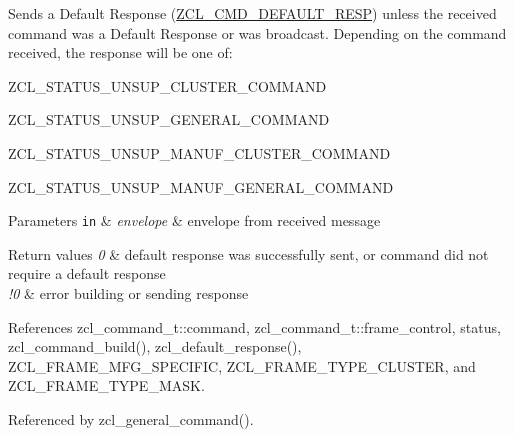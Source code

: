 Sends a Default Response (\hyperlink{group__zcl_ga92499f538455b8d5a525510fba54adb2}{Z\-C\-L\-\_\-\-C\-M\-D\-\_\-\-D\-E\-F\-A\-U\-L\-T\-\_\-\-R\-E\-S\-P}) unless the received command was a Default Response or was broadcast. Depending on the command received, the response will be one of\-:
\begin{DoxyItemize}
\item Z\-C\-L\-\_\-\-S\-T\-A\-T\-U\-S\-\_\-\-U\-N\-S\-U\-P\-\_\-\-C\-L\-U\-S\-T\-E\-R\-\_\-\-C\-O\-M\-M\-A\-N\-D
\item Z\-C\-L\-\_\-\-S\-T\-A\-T\-U\-S\-\_\-\-U\-N\-S\-U\-P\-\_\-\-G\-E\-N\-E\-R\-A\-L\-\_\-\-C\-O\-M\-M\-A\-N\-D
\item Z\-C\-L\-\_\-\-S\-T\-A\-T\-U\-S\-\_\-\-U\-N\-S\-U\-P\-\_\-\-M\-A\-N\-U\-F\-\_\-\-C\-L\-U\-S\-T\-E\-R\-\_\-\-C\-O\-M\-M\-A\-N\-D
\item Z\-C\-L\-\_\-\-S\-T\-A\-T\-U\-S\-\_\-\-U\-N\-S\-U\-P\-\_\-\-M\-A\-N\-U\-F\-\_\-\-G\-E\-N\-E\-R\-A\-L\-\_\-\-C\-O\-M\-M\-A\-N\-D
\end{DoxyItemize}


\begin{DoxyParams}[1]{Parameters}
\mbox{\tt in}  & {\em envelope} & envelope from received message\\
\hline
\end{DoxyParams}

\begin{DoxyRetVals}{Return values}
{\em 0} & default response was successfully sent, or command did not require a default response \\
\hline
{\em !0} & error building or sending response \\
\hline
\end{DoxyRetVals}


References zcl\-\_\-command\-\_\-t\-::command, zcl\-\_\-command\-\_\-t\-::frame\-\_\-control, status, zcl\-\_\-command\-\_\-build(), zcl\-\_\-default\-\_\-response(), Z\-C\-L\-\_\-\-F\-R\-A\-M\-E\-\_\-\-M\-F\-G\-\_\-\-S\-P\-E\-C\-I\-F\-I\-C, Z\-C\-L\-\_\-\-F\-R\-A\-M\-E\-\_\-\-T\-Y\-P\-E\-\_\-\-C\-L\-U\-S\-T\-E\-R, and Z\-C\-L\-\_\-\-F\-R\-A\-M\-E\-\_\-\-T\-Y\-P\-E\-\_\-\-M\-A\-S\-K.



Referenced by zcl\-\_\-general\-\_\-command().

